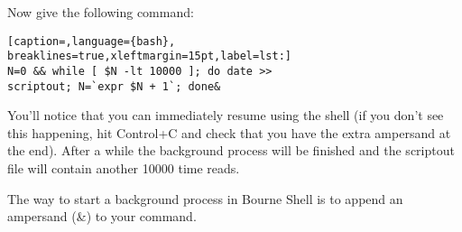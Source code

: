 Now give the following command:

\lstset{basicstyle=\scriptsize, numbers=left, captionpos=b, tabsize=4}
\begin{lstlisting}[caption=,language={bash},
breaklines=true,xleftmargin=15pt,label=lst:]
N=0 && while [ $N -lt 10000 ]; do date >>
scriptout; N=`expr $N + 1`; done&
\end{lstlisting}

You'll notice that you can immediately resume using the shell (if you don't see
this happening, hit Control+C and check that you have the extra ampersand at
the end). After a while the background process will be finished and the
scriptout file will contain another 10000 time reads.

The way to start a background process in Bourne Shell is to append an ampersand
(\&) to your command.
